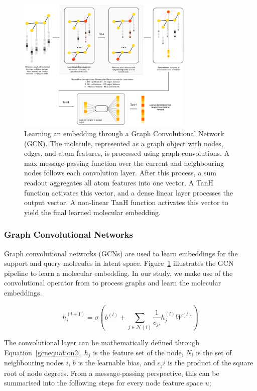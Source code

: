 \begin{figure}
	\centering
	\includegraphics[width=0.75\textwidth]{img/DVGCNArchi.png}
	\caption{Learning an embedding through a Graph Convolutional Network (GCN). The molecule, represented as a graph object with nodes, edges, and atom features, is processed using graph convolutions. A max message-passing function over the current and neighbouring nodes follows each convolution layer. After this process, a sum readout aggregates all atom features into one vector. A TanH function activates this vector, and a dense linear layer processes the output vector. A non-linear TanH function activates this vector to yield the final learned molecular embedding.}
	\label{fig:dvgcnarchi}
\end{figure}

\subsubsection{Graph Convolutional Networks}

Graph convolutional networks (GCNs) are used to learn embeddings for the support and query molecules in latent space. Figure~\ref{fig:dvgcnarchi} illustrates the GCN pipeline to learn a molecular embedding. In our study, we make use of the convolutional operator from \citet{kipf2016semi} to process graphs and learn the molecular embeddings.

\begin{equation}
	\label{gcnequation2}
	h_i^{(l+1)} = \sigma(b^{(l)} + \sum_{j\in\mathcal{N}(i)}\frac{1}{c_{ji}}h_j^{(l)}W^{(l)})
\end{equation}

The convolutional layer can be mathematically defined through Equation~\ref{gcnequation2}. $h_j$ is the feature set of the node, $N_i$ is the set of neighbouring nodes $i$, $b$ is the learnable bias, and $c_ji$ is the product of the square root of node degrees. From a message-passing perspective, this can be summarised into the following steps for every node feature space $u$;


